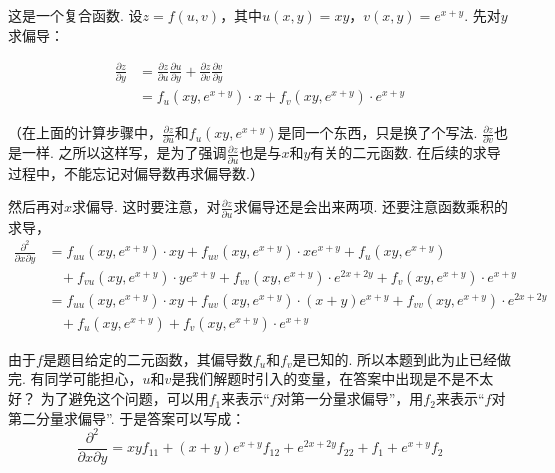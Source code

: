 \begin{solution}
这是一个复合函数. 设$z = f(u,v)$，其中$u(x,y) = xy$，$v(x,y) = e^{x+y}$.
先对$y$求偏导：

\begin{equation}
    \begin{aligned}
        \frac{\partial z}{\partial y} &= \frac{\partial z}{\partial u} \frac{\partial u}{\partial y} +
                                        \frac{\partial z}{\partial v} \frac{\partial v}{\partial y} \\
        &= f_u(xy,e^{x+y}) \cdot x + f_v(xy,e^{x+y}) \cdot e^{x+y}
        \nonumber
    \end{aligned}
\end{equation}

（在上面的计算步骤中，$\frac{\partial z}{\partial u}$和$f_u(xy,e^{x+y})$是同一个东西，只是换了个写法.
$\frac{\partial z}{\partial v}$也是一样.
之所以这样写，是为了强调$\frac{\partial z}{\partial u}$也是与$x$和$y$有关的二元函数.
在后续的求导过程中，不能忘记对偏导数再求偏导数.）


然后再对$x$求偏导.
这时要注意，对$\frac{\partial z}{\partial u}$求偏导还是会出来两项.
还要注意函数乘积的求导，
\begin{equation}
    \begin{aligned}
        \frac{\partial^2}{\partial x \partial y}
        &= f_{uu}(xy,e^{x+y})\cdot xy + f_{uv}(xy,e^{x+y}) \cdot xe^{x+y} + f_u(xy,e^{x+y}) \\
        &~~~~+ f_{vu}(xy,e^{x+y}) \cdot ye^{x+y} + f_{vv}(xy,e^{x+y}) \cdot e^{2x+2y} + f_v(xy,e^{x+y}) \cdot e^{x+y} \\
        &= f_{uu}(xy,e^{x+y})\cdot xy + f_{uv}(xy,e^{x+y}) \cdot (x+y)e^{x+y} + f_{vv}(xy,e^{x+y}) \cdot e^{2x+2y} \\
        &~~~~+ f_u(xy,e^{x+y}) + f_v(xy,e^{x+y}) \cdot e^{x+y}
        \nonumber
    \end{aligned}
\end{equation}

由于$f$是题目给定的二元函数，其偏导数$f_u$和$f_v$是已知的.
所以本题到此为止已经做完.
有同学可能担心，$u$和$v$是我们解题时引入的变量，在答案中出现是不是不太好？
为了避免这个问题，可以用$f_1$来表示“$f$对第一分量求偏导”，用$f_2$来表示“$f$对第二分量求偏导”.
于是答案可以写成：
$$
\frac{\partial^2}{\partial x \partial y}
= xyf_{11} + (x+y)e^{x+y} f_{12} + e^{2x+2y} f_{22} + f_1 + e^{x+y} f_2
$$
\end{solution}

